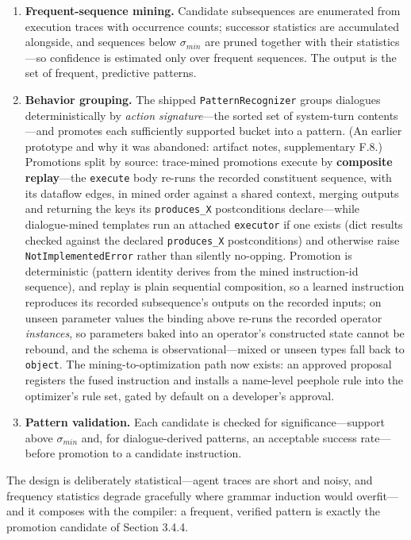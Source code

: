 \documentclass[
  sigconf,
  anonymous]{acmart}
\begin{document}
\begin{enumerate}
\def\labelenumi{\arabic{enumi}.}
\item
  \textbf{Frequent-sequence mining.} Candidate subsequences are
  enumerated from execution traces with occurrence counts; successor
  statistics are accumulated alongside, and sequences below
  \(\sigma_{min}\) are pruned together with their statistics---so
  confidence is estimated only over frequent sequences. The output is
  the set of frequent, predictive patterns.
\item
  \textbf{Behavior grouping.} The shipped \texttt{PatternRecognizer}
  groups dialogues deterministically by \emph{action signature}---the
  sorted set of system-turn contents---and promotes each sufficiently
  supported bucket into a pattern. (An earlier prototype and why it was
  abandoned: artifact notes, supplementary F.8.) Promotions split by
  source: trace-mined promotions execute by \textbf{composite
  replay}---the \texttt{execute} body re-runs the recorded constituent
  sequence, with its dataflow edges, in mined order against a shared
  context, merging outputs and returning the keys its
  \texttt{produces\_X} postconditions declare---while dialogue-mined
  templates run an attached \texttt{executor} if one exists (dict
  results checked against the declared \texttt{produces\_X}
  postconditions) and otherwise raise \texttt{NotImplementedError}
  rather than silently no-opping. Promotion is deterministic (pattern
  identity derives from the mined instruction-id sequence), and replay
  is plain sequential composition, so a learned instruction reproduces
  its recorded subsequence's outputs on the recorded inputs; on unseen
  parameter values the binding above re-runs the recorded operator
  \emph{instances}, so parameters baked into an operator's constructed
  state cannot be rebound, and the schema is observational---mixed or
  unseen types fall back to \texttt{object}. The mining-to-optimization
  path now exists: an approved proposal registers the fused instruction
  and installs a name-level peephole rule into the optimizer's rule set,
  gated by default on a developer's approval.
\item
  \textbf{Pattern validation.} Each candidate is checked for
  significance---support above \(\sigma_{min}\) and, for
  dialogue-derived patterns, an acceptable success rate---before
  promotion to a candidate instruction.
\end{enumerate}

The design is deliberately statistical---agent traces are short and
noisy, and frequency statistics degrade gracefully where grammar
induction would overfit---and it composes with the compiler: a frequent,
verified pattern is exactly the promotion candidate of Section 3.4.4.
\end{document}
